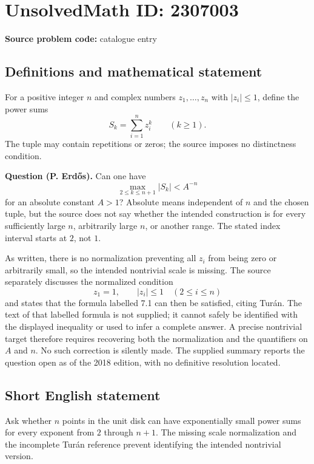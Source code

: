 \documentclass[11pt]{article}
\begin{document}
\section*{UnsolvedMath ID: 2307003}
\textbf{Source problem code:} catalogue entry
\subsection{Definitions and mathematical statement}
For a positive integer $n$ and complex numbers $z_1,\ldots,z_n$ with $|z_i|\leq1$, define the power sums
\[
S_k=\sum_{i=1}^{n}z_i^k\qquad(k\geq1).
\]
The tuple may contain repetitions or zeros; the source imposes no distinctness condition.

\textbf{Question (P. Erd\H{o}s).} Can one have
\[
\max_{2\leq k\leq n+1}|S_k|<A^{-n}
\]
for an absolute constant $A>1$? Absolute means independent of $n$ and the chosen tuple, but the source does not say whether the intended construction is for every sufficiently large $n$, arbitrarily large $n$, or another range. The stated index interval starts at $2$, not $1$.

As written, there is no normalization preventing all $z_i$ from being zero or arbitrarily small, so the intended nontrivial scale is missing. The source separately discusses the normalized condition
\[
z_1=1,\qquad |z_i|\leq1\quad(2\leq i\leq n)
\]
and states that the formula labelled 7.1 can then be satisfied, citing Tur\'an. The text of that labelled formula is not supplied; it cannot safely be identified with the displayed inequality or used to infer a complete answer. A precise nontrivial target therefore requires recovering both the normalization and the quantifiers on $A$ and $n$. No such correction is silently made. The supplied summary reports the question open as of the 2018 edition, with no definitive resolution located.
\subsection{Short English statement}
Ask whether $n$ points in the unit disk can have exponentially small power sums for every exponent from $2$ through $n+1$. The missing scale normalization and the incomplete Tur\'an reference prevent identifying the intended nontrivial version.
\end{document}

